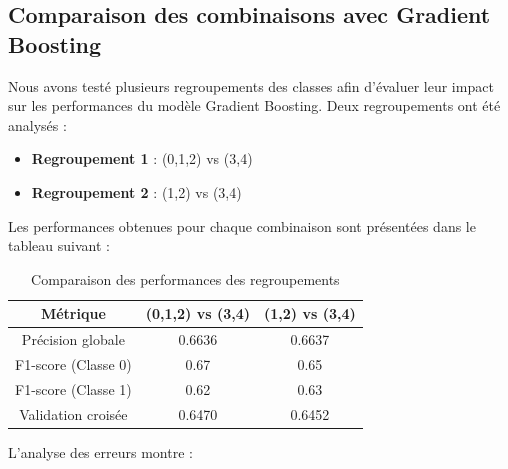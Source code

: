 \documentclass[a4paper,12pt]{article}
\begin{document}
 
\subsection{Comparaison des combinaisons avec Gradient Boosting}
 
Nous avons testé plusieurs regroupements des classes afin d'évaluer leur impact sur les performances du modèle Gradient Boosting. Deux regroupements ont été analysés :
 
\begin{itemize}

    \item \textbf{Regroupement 1} : (0,1,2) vs (3,4)

    \item \textbf{Regroupement 2} : (1,2) vs (3,4)

\end{itemize}
 
\bigskip
 
Les performances obtenues pour chaque combinaison sont présentées dans le tableau suivant :
 
\begin{table}[H]

\centering

\begin{tabular}{|c|c|c|}

\hline

\textbf{Métrique} & \textbf{(0,1,2) vs (3,4)} & \textbf{(1,2) vs (3,4)} \\ \hline

Précision globale & 0.6636 & 0.6637 \\ \hline

F1-score (Classe 0) & 0.67 & 0.65 \\ \hline

F1-score (Classe 1) & 0.62 & 0.63 \\ \hline

Validation croisée & 0.6470 & 0.6452 \\ \hline

\end{tabular}

\caption{Comparaison des performances des regroupements}

\end{table}
 
\bigskip
 
L'analyse des erreurs montre :
 
\end{document}
